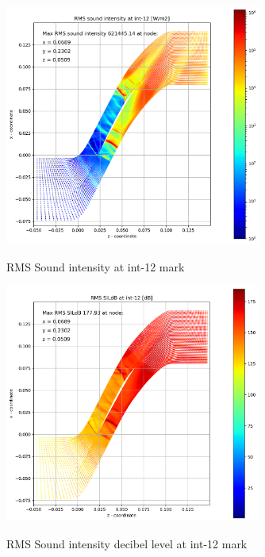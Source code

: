 \begin{figure}[ht]
  \centering
  \includegraphics[width=0.75\textwidth]{Figures/int-12-rms-sil.png} \label{int-12-rms-sil}
  \caption{RMS Sound intensity at int-12 mark}
  
  \vspace*{\floatsep}%

  \includegraphics[width=0.75\textwidth]{Figures/int-12-rms-sildb.png} \label{int-12-rms-sildb}
  \caption{RMS Sound intensity decibel level at int-12 mark}
\end{figure}



